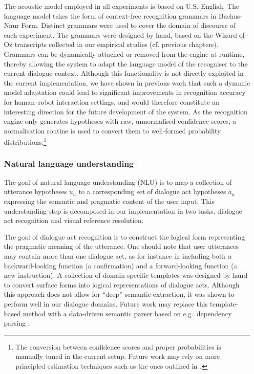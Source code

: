 The acoustic model employed in all experiments is based on U.S. English. The language model takes the form of context-free recognition grammars in Bachus-Naur Form. Distinct grammars were used to cover the domain of discourse of each experiment. The grammars were designed by hand, based on the Wizard-of-Oz transcripts collected in our empirical studies (cf. previous chapters). Grammars can be dynamically attached or removed from the engine at runtime, thereby allowing the system to adapt the language model of the recogniser to the current dialogue context. Although this functionality is not directly exploited in the current implementation, we have shown in previous work \citep[see][]{ESSLLI2008-springerreprint} that such a dynamic model adaptation could lead to significant improvements in recognition accuracy for human--robot interaction settings, and would therefore constitute an interesting direction for the future development of the system.  As the recognition engine only generates hypotheses with raw, unnormalised confidence scores, a normalisation routine is used to convert them to well-formed probability distributions.\footnote{The conversion between confidence scores and proper probabilities is manually tuned in the current setup.  Future work may rely on more principled estimation techniques such as the ones outlined in \cite{Williams08}.}


\subsubsection*{Natural language understanding}

The goal of natural language understanding (NLU) is to map a collection of utterance hypotheses $\tilde{u}_u$ to a corresponding set of dialogue act hypotheses $\tilde{a}_u$ expressing the semantic and pragmatic content of the user input. This understanding step is decomposed in our implementation in two tasks, dialogue act recognition and visual reference resolution.  

The goal of dialogue act recognition is to construct the logical form representing the pragmatic meaning of the utterance. One should note that user utterances may contain more than one dialogue act, as for instance in  including both a backward-looking function (a confirmation) and a forward-looking function (a new instruction).  A collection of domain-specific templates was designed by hand to convert surface forms into logical representations of dialogue acts.  Although this approach does not allow for ``deep'' semantic extraction, it was shown to perform well in our dialogue domains. Future work may replace this template-based method with a data-driven semantic parser based on e.g.\  dependency parsing \citep{Nivre:Etal07}. 


